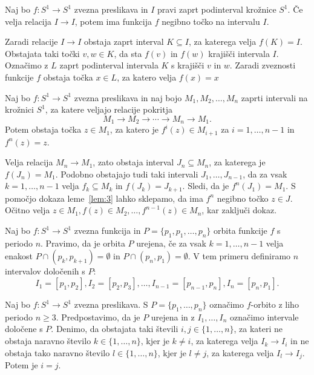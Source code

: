 \documentclass[../TG_magistrsko_delo_sections.tex]{subfiles}
\begin{document}
\begin{lema}\label{lem:3}		%
Naj bo $f : S^1 \to S^1$ zvezna preslikava in $I$ pravi zaprt podinterval krožnice $S^1$. Če velja relacija $I \to I$, potem ima funkcija $f$ negibno točko na intervalu $I$.
\end{lema}

\begin{dokaz}
Zaradi relacije $I \to I$ obstaja zaprt interval $K \subseteq I$, za katerega velja $f(K) = I$. Obstajata taki točki $v, w \in K$, da sta $f(v)$ in $f(w)$ krajišči intervala $I$. Označimo z $L$ zaprt podinterval intervala $K$ s krajišči $v$ in $w$. Zaradi zveznosti funkcije $f$ obstaja točka $x \in L$, za katero velja $f(x) = x$
\end{dokaz}

\begin{lema}\label{lem:4}				%
Naj bo $f : S^1 \to S^1$ zvezna preslikava in naj bojo $M_1, M_2, \dots, M_n$ zaprti intervali na krožnici $S^1$, za katere veljajo relacije pokritja 
$$M_1 \to M_2 \to \cdots \to M_n \to M_1.$$ 
Potem obstaja točka $z \in M_1$, za katero je $f^i(z) \in M_{i+1}$ za $i = 1, \dots, n-1$ in $f^n(z) =z$. 
\end{lema}

\begin{dokaz}
Velja relacija $M_n \to M_1$, zato obstaja interval $J_n \subseteq M_n$, za katerega je $f(J_n) = M_1$. Podobno obstajajo tudi taki intervali $J_1, \dots, J_{n-1}$, da za vsak $k = 1, \dots, n-1$ velja $f_k \subseteq M_k$ in $f(J_k) = J_{k+1}$. Sledi, da je $f^n(J_1) = M_1$. S pomočjo dokaza leme~\ref{lem:3} lahko sklepamo, da ima $f^n$ negibno točko $z \in J$. Očitno velja $z \in M_1, f(z) \in M_2, \dots, f^{n-1}(z) \in M_n$, kar zaključi dokaz.
\end{dokaz}

\begin{definicija}
Naj bo $f: S^1 \to S^1$ zvezna funkcija in $P =\{p_1, p_1, \dots, p_n \}$ orbita funkcije $f$ s periodo $n$. Pravimo, da je orbita $P$ urejena, če za vsak $k=1, \dots, n-1$ velja enakost $P \cap (p_k, p_{k+1}) = \emptyset$ in $P \cap (p_n, p_1) = \emptyset$. V tem primeru definiramo $n$ intervalov določenih s $P$:
$$I_1 = [p_1, p_2], I_2 = [p_2, p_3], \dots, I_{n-1} = [p_{n-1}, p_n], I_n = [p_n, p_1].$$
\end{definicija}

\begin{lema}\label{lem:5}					%
Naj bo $f : S^1 \to S^1$ zvezna preslikava. S $P=\{p_1, \dots, p_n\}$ označimo $f$-orbito z liho periodo $n \geq 3$. Predpostavimo, da je $P$ urejena in z $I_1, \dots, I_n$ označimo intervale določene s $P$. Denimo, da obstajata taki števili $i, j \in \{1, \dots, n \}$, za kateri ne obstaja naravno število $k \in \{1, \dots, n\}$, kjer je $k \neq i$, za katerega velja $I_k \to I_i$ in ne obstaja tako naravno število $l \in \{1, \dots, n\}$, kjer je $l \neq j$, za katerega velja $I_l \to I_j$. Potem je $i=j$.
\end{lema}
\end{document}
